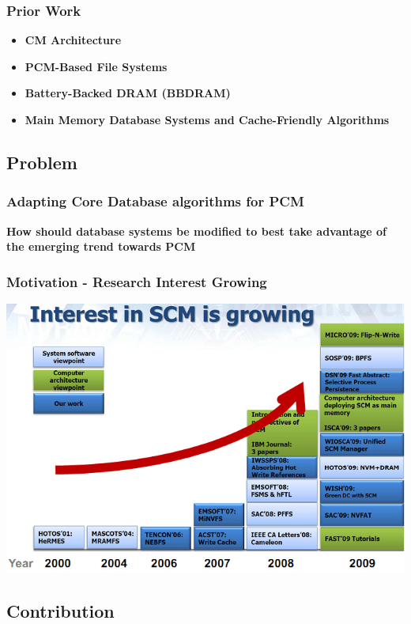 \begin{frame}
\frametitle{Prior Work}

\begin{itemize}
\item \textbf{CM Architecture}
\item \textbf{PCM-Based File Systems}
\item \textbf{Battery-Backed DRAM (BBDRAM)}
\item \textbf{Main Memory Database Systems and Cache-Friendly Algorithms}
\end{itemize}


\end{frame}




\subsection{Problem}

\begin{frame}
\frametitle{Adapting Core Database algorithms for PCM}

\textbf{How should database systems be modified to best take advantage of the emerging trend towards PCM}

\end{frame}

\begin{frame}
\frametitle{Motivation - Research Interest Growing}

\includegraphics[scale=0.6]{images/growinginterest.png}

\end{frame}




\subsection{Contribution}

